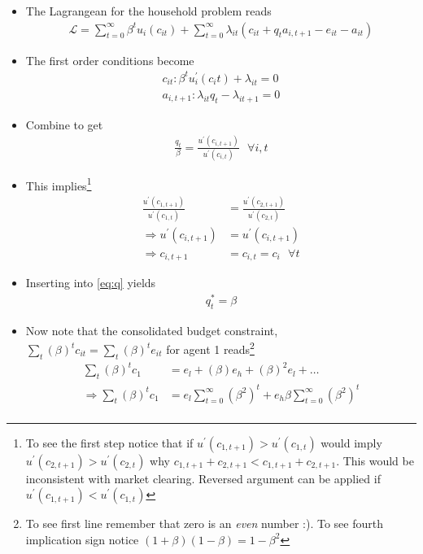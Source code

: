 \documentclass{scrartcl}
\begin{document}
\begin{itemize}
	\item The Lagrangean for the household problem reads
	\begin{align}
	\mathcal{L}=\sum_{t=0}^{\infty} \beta^t u_{i} (c_{it})+\sum_{t=0}^{\infty} \lambda_{it} \left( c_{it}+q_t a_{i,t+1}-e_{it}-a_{it}\right)
	\end{align}
	\item The first order conditions become
	\begin{align}
	c_{it}: \beta^t u^\prime_i(c_it)+\lambda_{it}=0 \\
	a_{i,t+1}: \lambda_{it} q_t - \lambda_{it+1}=0
	\end{align}
	\item Combine to get
	\begin{align}
	\frac{q_t}{\beta}=\frac{u^\prime(c_{i,t+1})}{u^\prime(c_{i,t})} \text{ } \forall i,t \label{eq:q}
	\end{align}
	\item This implies\footnote{To see the first step notice that if $u^\prime( c_{1,t+1})>u^\prime( c_{1,t})$ would imply $u^\prime( c_{2,t+1})>u^\prime( c_{2,t})$ why $c_{1,t+1}+c_{2,t+1}<c_{1,t+1}+c_{2,t+1}$. This would be inconsistent with market clearing. Reversed argument can be applied if $u^\prime( c_{1,t+1})<u^\prime( c_{1,t})$}
	\begin{align}
	\frac{u^\prime(c_{1,t+1})}{u^\prime(c_{1,t})}&=	\frac{u^\prime(c_{2,t+1})}{u^\prime(c_{2,t})} \\
	\Rightarrow u^\prime( c_{i,t+1})&=u^\prime( c_{i,t+1})  \\
	\Rightarrow c_{i,t+1}&=c_{i,t}=c_i \text{ } \forall t
	\end{align}
	\item Inserting into \eqref{eq:q} yields 
	\begin{align}
	q_t^*=\beta
	\end{align}
	\item Now note that the consolidated budget constraint, $\sum_t \left( \beta \right)^t c_{it}=\sum_t \left( \beta \right)^t e_{it}$ for agent 1 reads\footnote{To see first line remember that zero is an \emph{even} number :). To see fourth implication sign notice $(1+\beta)(1-\beta)=1-\beta^2$}	
		\begin{align}
	\sum_t \left( \beta \right)^t c_{1}&=e_l+\left( \beta \right)e_h+\left( \beta \right)^2e_l+\dots \\
\Rightarrow \sum_t \left( \beta \right)^t c_{1}&=e_l\sum_{t=0}^{\infty} (\beta^2)^t+e_h \beta \sum_{t=0}^{\infty} (\beta^2)^t\\

\end{align}
\end{itemize}
\end{document}
